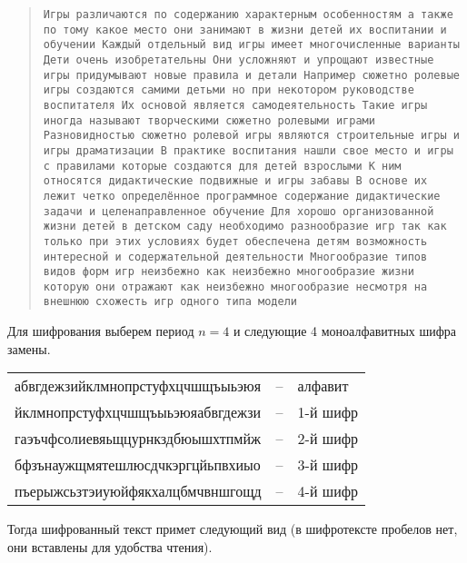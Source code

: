 \begin{quote}
    \noindent \texttt{Игры различаются по содержанию характерным особенностям а также по тому какое место они занимают в жизни детей их воспитании и обучении Каждый отдельный вид игры имеет многочисленные варианты Дети очень изобретательны Они усложняют и упрощают известные игры придумывают новые правила и детали Например сюжетно ролевые игры создаются самими детьми но при некотором руководстве воспитателя Их основой является самодеятельность Такие игры иногда называют творческими сюжетно ролевыми играми Разновидностью сюжетно ролевой игры являются строительные игры и игры драматизации В практике воспитания нашли свое место и игры с правилами которые создаются для детей взрослыми К ним относятся дидактические подвижные и игры забавы В основе их лежит четко определённое программное содержание дидактические задачи и целенаправленное обучение Для хорошо организованной жизни детей в детском саду необходимо разнообразие игр так как только при этих условиях будет обеспечена детям возможность интересной и содержательной деятельности Многообразие типов видов форм игр неизбежно как неизбежно многообразие жизни которую они отражают как неизбежно многообразие несмотря на внешнюю схожесть игр одного типа модели}
\end{quote}

Для шифрования выберем период $n=4$ и следующие 4 моноалфавитных шифра замены.

\begin{center} \begin{tabular}{|lcl|}
    \hline
    абвгдежзийклмнопрстуфхцчшщъыьэюя & -- & алфавит \\
    йклмнопрстуфхцчшщъыьэюяабвгдежзи & -- & 1-й шифр \\
    гаэъчфсолиевяьщцурнкздбюышхтпмйж & -- & 2-й шифр \\
    бфзънаужщмятешлюсдчкэргцйьпвхиыо & -- & 3-й шифр \\
    пъерыжсьзтэиуюйфякхалцбмчвншгощд & -- & 4-й шифр \\
    \hline
\end{tabular} \end{center}

Тогда шифрованный текст примет следующий вид (в шифротексте пробелов нет, они вставлены для удобства чтения).

